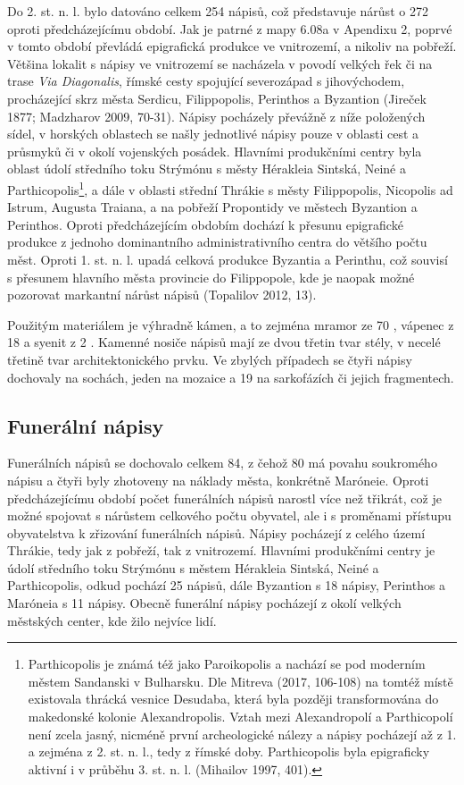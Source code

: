 Do 2. st. n. l. bylo datováno celkem 254 nápisů, což představuje nárůst o 272  oproti předcházejícímu období. Jak je patrné z mapy 6.08a v Apendixu 2, poprvé v tomto období převládá epigrafická produkce ve vnitrozemí, a nikoliv na pobřeží. Většina lokalit s nápisy ve vnitrozemí se nacházela v povodí velkých řek či na trase {\em Via Diagonalis}, římské cesty spojující severozápad s jihovýchodem, procházející skrz města Serdicu, Filippopolis, Perinthos a Byzantion (Jireček 1877; Madzharov 2009, 70-31). Nápisy pocházely převážně z níže položených sídel, v horských oblastech se našly jednotlivé nápisy pouze v oblasti cest a průsmyků či v okolí vojenských posádek. Hlavními produkčními centry byla oblast údolí středního toku Strýmónu s městy Hérakleia Sintská, Neiné a Parthicopolis\footnote{Parthicopolis je známá též jako Paroikopolis a nachází se pod moderním městem Sandanski v Bulharsku. Dle Mitreva (2017, 106-108) na tomtéž místě existovala thrácká vesnice Desudaba, která byla později transformována do makedonské kolonie Alexandropolis. Vztah mezi Alexandropolí a Parthicopolí není zcela jasný, nicméně první archeologické nálezy a nápisy pocházejí až z 1. a zejména z 2. st. n. l., tedy z římské doby. Parthicopolis byla epigraficky aktivní i v průběhu 3. st. n. l. (Mihailov 1997, 401).}, a dále v oblasti střední Thrákie s městy Filippopolis, Nicopolis ad Istrum, Augusta Traiana, a na pobřeží Propontidy ve městech Byzantion a Perinthos. Oproti předcházejícím obdobím dochází k přesunu epigrafické produkce z jednoho dominantního administrativního centra do většího počtu měst. Oproti 1. st. n. l. upadá celková produkce Byzantia a Perinthu, což souvisí s přesunem hlavního města provincie do Filippopole, kde je naopak možné pozorovat markantní nárůst nápisů (Topalilov 2012, 13).

Použitým materiálem je výhradně kámen, a to zejména mramor ze 70 , vápenec z 18  a syenit z 2 . Kamenné nosiče nápisů mají ze dvou třetin tvar stély, v necelé třetině tvar architektonického prvku. Ve zbylých případech se čtyři nápisy dochovaly na sochách, jeden na mozaice a 19 na sarkofázích či jejich fragmentech.

\subsection[funerální-nápisy-13]{Funerální nápisy}

Funerálních nápisů se dochovalo celkem 84, z čehož 80 má povahu soukromého nápisu a čtyři byly zhotoveny na náklady města, konkrétně Maróneie. Oproti předcházejícímu období počet funerálních nápisů narostl více než třikrát, což je možné spojovat s nárůstem celkového počtu obyvatel, ale i s proměnami přístupu obyvatelstva k zřizování funerálních nápisů. Nápisy pocházejí z celého území Thrákie, tedy jak z pobřeží, tak z vnitrozemí. Hlavními produkčními centry je údolí středního toku Strýmónu s městem Hérakleia Sintská, Neiné a Parthicopolis, odkud pochází 25 nápisů, dále Byzantion s 18 nápisy, Perinthos a Maróneia s 11 nápisy. Obecně funerální nápisy pocházejí z okolí velkých městských center, kde žilo nejvíce lidí.

